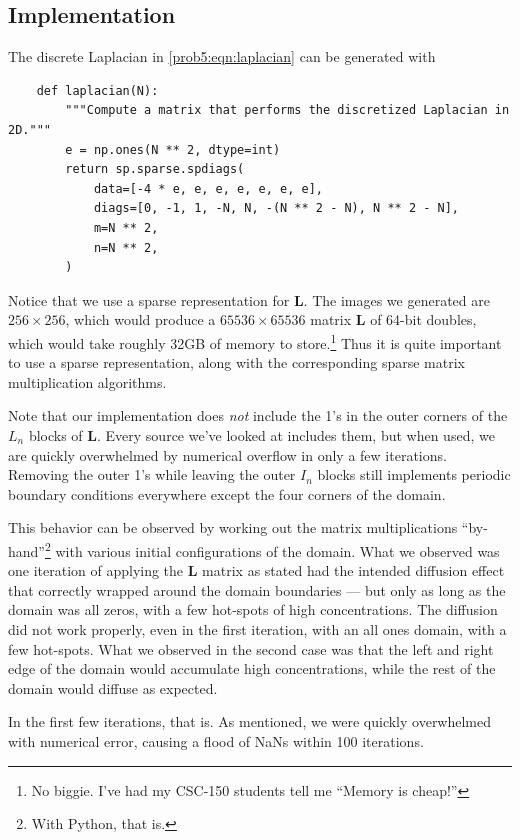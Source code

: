 \subsection{Implementation}
The discrete Laplacian in \autoref{prob5:eqn:laplacian} can be generated with
\begin{verbatim}
    def laplacian(N):
        """Compute a matrix that performs the discretized Laplacian in 2D."""
        e = np.ones(N ** 2, dtype=int)
        return sp.sparse.spdiags(
            data=[-4 * e, e, e, e, e, e, e],
            diags=[0, -1, 1, -N, N, -(N ** 2 - N), N ** 2 - N],
            m=N ** 2,
            n=N ** 2,
        )
\end{verbatim}
Notice that we use a sparse representation for $\mathbf L$.
The images we generated are $256 \times 256$, which would produce a $65536 \times 65536$ matrix $\mathbf L$ of 64-bit doubles, which would take roughly 32GB of memory to store.\footnote{No biggie. I've had my CSC-150 students tell me ``Memory is cheap!''}
Thus it is quite important to use a sparse representation, along with the corresponding sparse matrix multiplication algorithms.

Note that our implementation does \textit{not} include the 1's in the outer corners of the $L_n$ blocks of $\mathbf L$.
Every source we've looked at includes them, but when used, we are quickly overwhelmed by numerical overflow in only a few iterations.
Removing the outer 1's while leaving the outer $I_n$ blocks still implements periodic boundary conditions everywhere except the four corners of the domain.

This behavior can be observed by working out the matrix multiplications ``by-hand''\footnote{With Python, that is.} with various initial configurations of the domain.
What we observed was one iteration of applying the $\mathbf L$ matrix as stated had the intended diffusion effect that correctly wrapped around the domain boundaries --- but only as long as the domain was all zeros, with a few hot-spots of high concentrations.
The diffusion did not work properly, even in the first iteration, with an all ones domain, with a few hot-spots.
What we observed in the second case was that the left and right edge of the domain would accumulate high concentrations, while the rest of the domain would diffuse as expected.

In the first few iterations, that is.
As mentioned, we were quickly overwhelmed with numerical error, causing a flood of NaNs within 100 iterations.


